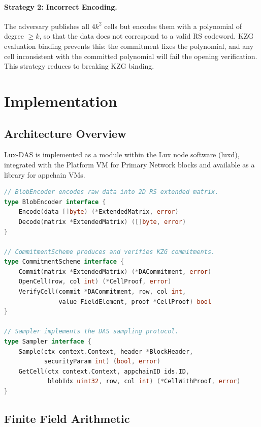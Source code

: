 \documentclass[11pt,a4paper]{article}
\theoremstyle{plain}
\theoremstyle{definition}
\theoremstyle{remark}
\begin{document}
\paragraph{Strategy 2: Incorrect Encoding.}
The adversary publishes all $4k^2$ cells but encodes them with a polynomial of degree $\geq k$,
so that the data does not correspond to a valid RS codeword. KZG evaluation binding prevents
this: the commitment fixes the polynomial, and any cell inconsistent with the committed
polynomial will fail the opening verification. This strategy reduces to breaking KZG binding.


\section{Implementation}
\label{sec:implementation}

\subsection{Architecture Overview}

Lux-DAS is implemented as a module within the Lux node software (luxd), integrated
with the Platform VM for Primary Network blocks and available as a library for appchain VMs.

\begin{lstlisting}[language=Go, caption={Core DAS interfaces}]
// BlobEncoder encodes raw data into 2D RS extended matrix.
type BlobEncoder interface {
    Encode(data []byte) (*ExtendedMatrix, error)
    Decode(matrix *ExtendedMatrix) ([]byte, error)
}

// CommitmentScheme produces and verifies KZG commitments.
type CommitmentScheme interface {
    Commit(matrix *ExtendedMatrix) (*DACommitment, error)
    OpenCell(row, col int) (*CellProof, error)
    VerifyCell(commit *DACommitment, row, col int,
               value FieldElement, proof *CellProof) bool
}

// Sampler implements the DAS sampling protocol.
type Sampler interface {
    Sample(ctx context.Context, header *BlockHeader,
           securityParam int) (bool, error)
    GetCell(ctx context.Context, appchainID ids.ID,
            blobIdx uint32, row, col int) (*CellWithProof, error)
}
\end{lstlisting}

\subsection{Finite Field Arithmetic}
\end{document}
